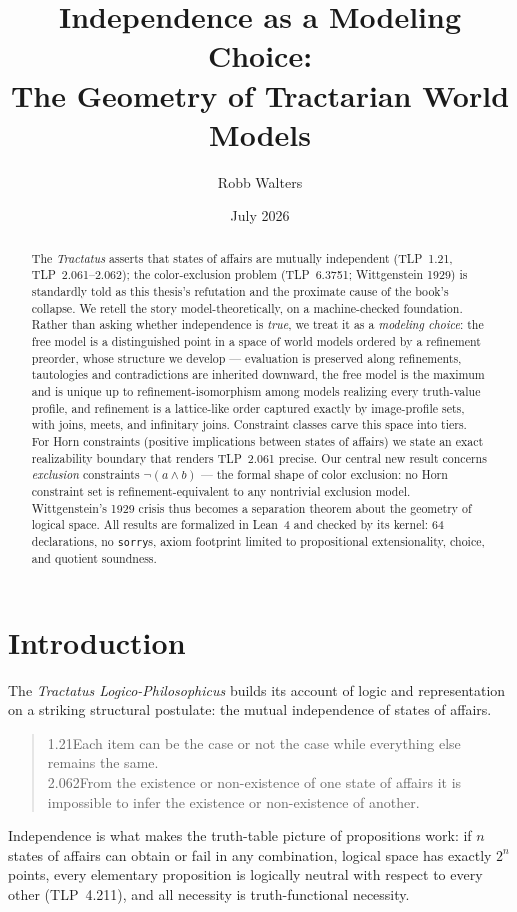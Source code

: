 \documentclass[10pt, letterpaper]{article}
\title{Independence as a Modeling Choice:\\
  The Geometry of Tractarian World Models}
\author{Robb Walters}
\date{July 2026}
\theoremstyle{remark}
\newcommand{\lean}[1]{\texttt{#1}}
\newcommand{\TLP}[1]{TLP~#1}
\begin{document}
\maketitle

\begin{abstract}
The \emph{Tractatus} asserts that states of affairs are mutually independent
(\TLP{1.21}, \TLP{2.061--2.062}); the color-exclusion problem (\TLP{6.3751};
Wittgenstein 1929) is standardly told as this thesis's refutation and the
proximate cause of the book's collapse. We retell the story
model-theoretically, on a machine-checked foundation. Rather than asking
whether independence is \emph{true}, we treat it as a \emph{modeling choice}:
the free model is a distinguished point in a space of world models ordered by
a refinement preorder, whose structure we develop --- evaluation is preserved
along refinements, tautologies and contradictions are inherited downward, the
free model is the maximum and is unique up to refinement-isomorphism among
models realizing every truth-value profile, and refinement is a lattice-like
order captured exactly by image-profile sets, with joins, meets, and
infinitary joins. Constraint classes carve this space into tiers. For Horn
constraints (positive implications between states of affairs) we state an
exact realizability boundary that renders \TLP{2.061} precise. Our central
new result concerns \emph{exclusion} constraints
$\neg(a \wedge b)$ --- the formal shape of color exclusion: no Horn constraint
set is refinement-equivalent to any nontrivial exclusion model. Wittgenstein's
1929 crisis thus becomes a separation theorem about the geometry of logical
space. All results are formalized in Lean~4 and checked by its kernel: 64
declarations, no \lean{sorry}s, axiom footprint limited to propositional
extensionality, choice, and quotient soundness.
\end{abstract}

\section{Introduction}\label{sec:intro}

The \emph{Tractatus Logico-Philosophicus} builds its account of logic and
representation on a striking structural postulate: the mutual independence of
states of affairs.
\begin{quote}
  1.21\quad Each item can be the case or not the case while everything else
  remains the same.\\[2pt]
  2.062\quad From the existence or non-existence of one state of affairs it is
  impossible to infer the existence or non-existence of another.
  \cite{wittgenstein1921}
\end{quote}
Independence is what makes the truth-table picture of propositions work:
if $n$ states of affairs can obtain or fail in any combination, logical space
has exactly $2^n$ points, every elementary proposition is logically neutral
with respect to every other (\TLP{4.211}), and all necessity is truth-functional
necessity.
\end{document}
